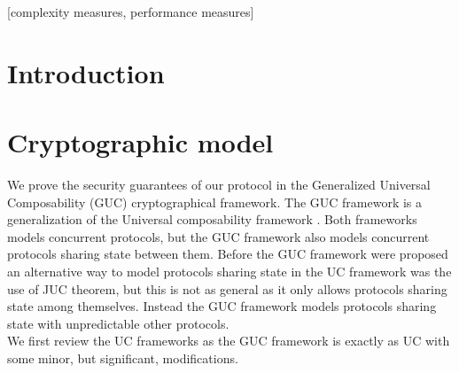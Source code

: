 \documentclass{acm_proc_article-sp}
\begin{document}
\begin{abstract}
This paper provides a sample of a \LaTeX\ document which conforms to
the formatting guidelines for ACM SIG Proceedings.
It complements the document \textit{Author's Guide to Preparing
ACM SIG Proceedings Using \LaTeX$2_\epsilon$\ and Bib\TeX}. This
source file has been written with the intention of being
compiled under \LaTeX$2_\epsilon$\ and BibTeX.

The developers have tried to include every imaginable sort
of ``bells and whistles", such as a subtitle, footnotes on
title, subtitle and authors, as well as in the text, and
every optional component (e.g. Acknowledgments, Additional
Authors, Appendices), not to mention examples of
equations, theorems, tables and figures.

To make best use of this sample document, run it through \LaTeX\
and BibTeX, and compare this source code with the printed
output produced by the dvi file.
\end{abstract}

[complexity measures, performance measures]



\section{Introduction}

\section{Cryptographic model}

We prove the security guarantees of our protocol in the Generalized Universal Composability (GUC) cryptographical
framework. The GUC framework \cite{conf/tcc/CanettiDPW07} is a generalization of the Universal composability
framework \cite{conf/focs/Canetti01}. Both frameworks models concurrent protocols, but the GUC framework also
models concurrent protocols sharing state between them. Before the GUC framework were proposed an alternative way
to model protocols sharing state in the UC framework was the use of JUC theorem, but this is not as general as
it only allows protocols sharing state among themselves. Instead the GUC framework models protocols sharing state with
unpredictable other protocols.\\
We first review the UC frameworks as the GUC framework is exactly as UC with some minor, but significant, modifications.
\end{document}
